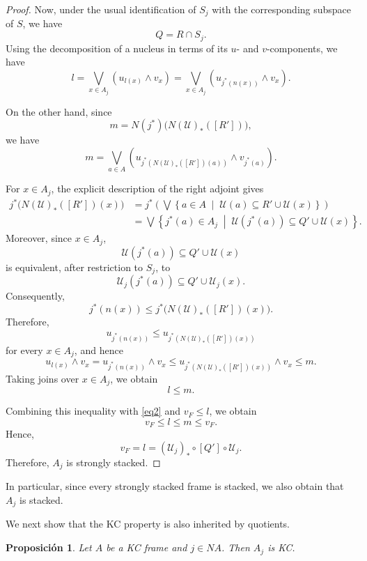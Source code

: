 \documentclass[11pt]{amsart}
\theoremstyle{plain}
\newtheorem{prop}[thm]{Proposición}
\theoremstyle{definition}
\begin{document}
\begin{proof}
Now, under the usual identification of $S_j$ with the corresponding subspace
of $S$, we have
\[
Q=R\cap S_j.
\]
Using the decomposition of a nucleus in terms of its $u$- and $v$-components,
we have
\[
l
=
\bigvee_{x\in A_j}
\left(
u_{l(x)}\wedge v_x
\right)
=
\bigvee_{x\in A_j}
\left(
u_{j^*(n(x))}\wedge v_x
\right).
\]

On the other hand, since
\[
m
=
N(j^*)\bigl(N(\mathcal{U})_*([R'])\bigr),
\]
we have
\[
m
=
\bigvee_{a\in A}
\left(
u_{j^*(N(\mathcal{U})_*([R'])(a))}
\wedge
v_{j^*(a)}
\right).
\]

For $x\in A_j$, the explicit description of the right adjoint gives
\[
\begin{aligned}
j^*\bigl(N(\mathcal{U})_*([R'])(x)\bigr)
&=
j^*\left(
\bigvee
\left\{
a\in A
\;\middle|\;
\mathcal{U}(a)
\subseteq
R'\cup\mathcal{U}(x)
\right\}
\right)\\
&=
\bigvee
\left\{
j^*(a)\in A_j
\;\middle|\;
\mathcal{U}(j^*(a))
\subseteq
Q'\cup\mathcal{U}(x)
\right\}.
\end{aligned}
\]
Moreover, since $x\in A_j$,
\[
\mathcal{U}(j^*(a))
\subseteq
Q'\cup\mathcal{U}(x)
\]
is equivalent, after restriction to $S_j$, to
\[
\mathcal{U}_j(j^*(a))
\subseteq
Q'\cup\mathcal{U}_j(x).
\]
Consequently,
\[
j^*(n(x))
\leq
j^*\bigl(N(\mathcal{U})_*([R'])(x)\bigr).
\]
Therefore,
\[
u_{j^*(n(x))}
\leq
u_{j^*(N(\mathcal{U})_*([R'])(x))}
\]
for every $x\in A_j$, and hence
\[
u_{l(x)}\wedge v_x
=
u_{j^*(n(x))}\wedge v_x
\leq
u_{j^*(N(\mathcal{U})_*([R'])(x))}\wedge v_x
\leq m.
\]
Taking joins over $x\in A_j$, we obtain
\[
l\leq m.
\]

Combining this inequality with \eqref{eq2} and $v_F\leq l$, we obtain
\[
v_F\leq l\leq m\leq v_F.
\]
Hence,
\[
v_F=l
=
(\mathcal{U}_j)_*\circ[Q']\circ\mathcal{U}_j.
\]
Therefore, $A_j$ is strongly stacked.
\end{proof}

In particular, since every strongly stacked frame is stacked, we also
obtain that \(A_j\) is stacked.

We next show that the KC property is also inherited by quotients.

\begin{prop}\label{KCquout}
Let $A$ be a KC frame and $j\in NA$. Then $A_j$ is KC.
\end{prop}
\end{document}
